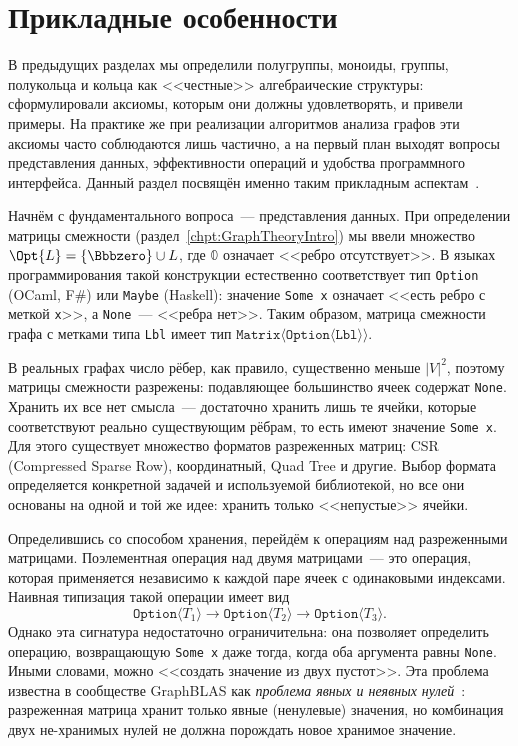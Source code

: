 \section{Прикладные особенности}

В предыдущих разделах мы определили полугруппы, моноиды, группы, полукольца и кольца как <<честные>> алгебраические структуры: сформулировали аксиомы, которым они должны удовлетворять, и привели примеры.
На практике же при реализации алгоритмов анализа графов эти аксиомы часто соблюдаются лишь частично, а на первый план выходят вопросы представления данных, эффективности операций и удобства программного интерфейса.
Данный раздел посвящён именно таким прикладным аспектам~.

Начнём с фундаментального вопроса~--- представления данных.
При определении матрицы смежности (раздел~\ref{chpt:GraphTheoryIntro}) мы ввели множество $\Opt{L} = \{\Bbbzero\} \cup L$, где $\Bbbzero$ означает <<ребро отсутствует>>.
В языках программирования такой конструкции естественно соответствует тип \texttt{Option} (OCaml, F\#) или \texttt{Maybe} (Haskell): значение \texttt{Some x} означает <<есть ребро с меткой \texttt{x}>>, а \texttt{None}~--- <<ребра нет>>.
Таким образом, матрица смежности графа с метками типа \texttt{Lbl} имеет тип $\texttt{Matrix}\langle\texttt{Option}\langle\texttt{Lbl}\rangle\rangle$.

В реальных графах число рёбер, как правило, существенно меньше $|V|^2$, поэтому матрицы смежности разрежены: подавляющее большинство ячеек содержат \texttt{None}.
Хранить их все нет смысла~--- достаточно хранить лишь те ячейки, которые соответствуют реально существующим рёбрам, то есть имеют значение \texttt{Some x}.
Для этого существует множество форматов разреженных матриц: CSR (Compressed Sparse Row), координатный, Quad Tree и другие.
Выбор формата определяется конкретной задачей и используемой библиотекой, но все они основаны на одной и той же идее: хранить только <<непустые>> ячейки.

Определившись со способом хранения, перейдём к операциям над разреженными матрицами.
Поэлементная операция над двумя матрицами~--- это операция, которая применяется независимо к каждой паре ячеек с одинаковыми индексами.
Наивная типизация такой операции имеет вид
\[
    \texttt{Option}\langle T_1\rangle \to \texttt{Option}\langle T_2\rangle \to \texttt{Option}\langle T_3\rangle.
\]
Однако эта сигнатура недостаточно ограничительна: она позволяет определить операцию, возвращающую \texttt{Some x} даже тогда, когда оба аргумента равны \texttt{None}.
Иными словами, можно <<создать значение из двух пустот>>.
Эта проблема известна в сообществе GraphBLAS как \emph{проблема явных и неявных нулей}~: разреженная матрица хранит только явные (ненулевые) значения, но комбинация двух не-хранимых нулей не должна порождать новое хранимое значение.

